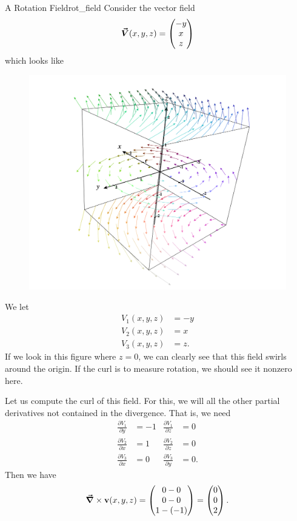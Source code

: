 		        \begin{ex}{A Rotation Field}{rot_field}
		        Consider the vector field
		        \[
		        \boldsymbol{\vec{V}}(x,y,z) = \begin{pmatrix} -y \\ x \\ z\end{pmatrix}
		        \]
		        which looks like
		        \begin{figure}[H]
		            \centering
		            \includegraphics[width=.6\textwidth]{Figures_Part_6/curl_field.png}
		        \end{figure}
		        We let
		        \begin{align*}
		            V_1(x,y,z) &= -y\\
		            V_2(x,y,z) &= x\\
		            V_3(x,y,z) &= z.
		        \end{align*}
		        If we look in this figure where $z=0$, we can clearly see that this field swirls around the origin.  If the curl is to measure rotation, we should see it nonzero here.
		        
		        Let us compute the curl of this field.  For this, we will all the other partial derivatives not contained in the divergence. That is, we need
		        \begin{align*}
		            \frac{\partial V_1}{\partial y} &= -1 & \frac{\partial V_1}{\partial z} &= 0\\
		            \frac{\partial V_2}{\partial x} &= 1& \frac{\partial V_2}{\partial z} &= 0\\
		            \frac{\partial V_3}{\partial x} &= 0 &  \frac{\partial V_3}{\partial y} &=0.
		        \end{align*}
		        Then we have
		        \[
		        \boldsymbol{\vec{\nabla}} \times \mathbf{v}(x,y,z) = \begin{pmatrix} 0-0\\ 0-0 \\ 1-(-1)\end{pmatrix} = \begin{pmatrix} 0\\ 0 \\ 2\end{pmatrix}.
		        \]
		        

\end{ex}
